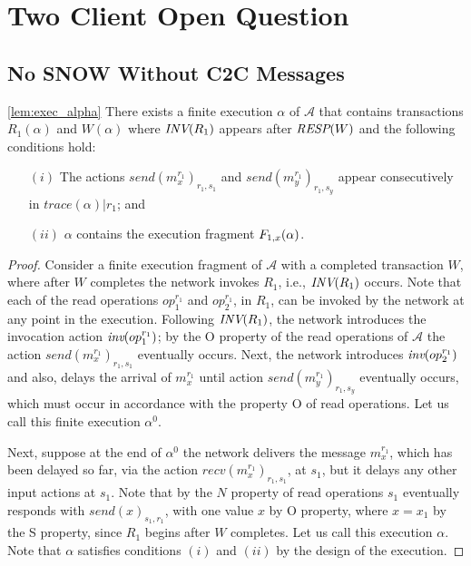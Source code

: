 \section{Two Client Open Question}
 \subsection{No  SNOW Without C2C  Messages}
 \label{app:2c-no-c2c}

\begin{lemma*}\ref{lem:exec_alpha} 
There exists a finite execution $\alpha$ of $\mathcal{A}$ that contains transactions $R_1(\alpha)$  
 and $W(\alpha)$ where ${\textit{INV}(R_1)}$ appears after ${\textit{RESP}(W)}$ and the following conditions hold:
\begin{enumerate}
\item[$(i)$] The actions $send(m_x^{r_1})_{r_1, s_1}$ and  $send(m_y^{r_1})_{r_1, s_y}$ appear consecutively in $trace(\alpha)|r_1$; and 
\item[$(ii)$]   $\alpha$ contains the execution fragment  ${ F_{1, x}(\alpha)}$.
\end{enumerate} 
\end{lemma*}


\begin{proof}
Consider a finite  execution fragment  of $\mathcal{A}$ with a completed transaction $W$, where  after $W$ 
completes  the network invokes $R_1$, i.e., ${\textit{INV}(R_1)}$ occurs.
 Note that each of the  read operations $op_1^{r_1}$ and $op_2^{r_1}$,  in $R_1$,  can be invoked by 
the network at any point in the execution.  
 Following ${\textit{INV}(R_1)}$,  the network introduces the invocation action ${\textit{inv}(op_1^{r_1})}$;  by the O property of the read operations of $\mathcal{A}$  
the action $send(m_x^{r_1})_{r_1, s_1}$ eventually occurs. Next, the network introduces 
 ${\textit{inv}(op_2^{r_1})}$ and also, delays the arrival of  $m_x^{r_1}$ until  action $send(m_y^{r_1})_{r_1, s_y}$ 
eventually occurs, 
 which  must occur in accordance with  the property O  of read operations. Let us call this finite execution $\alpha^0$. 
 
 Next, suppose at the end of $\alpha^0$  the network delivers the message $m_x^{r_1}$, which has been delayed so far,  via the action  $recv(m_x^{r_1})_{r_1, s_1}$, 
 at  $s_1$,   but  it delays any  other input actions at $s_1$. Note that by the $N$ property of read operations $s_1$ eventually responds with  $send(x)_{s_1, r_1}$, with one value $x$ by O property,  where $x = x_1$ by the S property, since $R_1$ begins after $W$ completes. 
 Let us call this execution $\alpha$. Note that $\alpha$ satisfies conditions $(i)$ and $(ii)$ by the design of the execution.
\end{proof}

